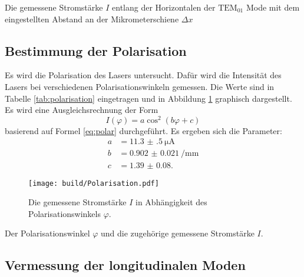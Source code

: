 \begin{table}
	\centering
	\caption{Die gemessene Stromstärke $I$ entlang der Horizontalen der $\text{TEM}_{\text{01}}$ Mode mit dem eingestellten Abstand an der Mikrometerschiene $\Delta x$}
	
	
	\label{tab:T01}
\end{table}

\subsection{Bestimmung der Polarisation}

Es wird die Polarisation des Lasers untersucht. Dafür wird die Intensität des Lasers bei verschiedenen Polarisationswinkeln gemessen. Die Werte sind in Tabelle \ref{tab:polarisation} eingetragen und in Abbildung \ref{fig:polarisation} graphisch dargestellt. 
Es wird eine Ausgleichsrechnung der Form
\[
I(\varphi) = a\cos^2\left(b\varphi+c\right)
\] 
basierend auf Formel \eqref{eq:polar} durchgeführt.
Es ergeben sich die Parameter:
\begin{align*}
a &= \SI{11.3(5)}{\micro\ampere}\\
b &= \SI{0.902(21)}{\per\milli\metre}\\
c &= \num{1.39(8)}\text{.}
\end{align*}

\begin{figure}
	\centering
	\texttt{[image: build/Polarisation.pdf]}
	\caption{Die gemessene Stromstärke $I$ in Abhängigkeit des Polarisationswinkels $\varphi$.}
	\label{fig:polarisation}
\end{figure}

\begin{table}
	\centering
	\caption{Der Polarisationswinkel $\varphi$ und die zugehörige gemessene Stromstärke $I$.}
	
	\label{tab:polarisation}
\end{table}

\subsection{Vermessung der longitudinalen Moden}

